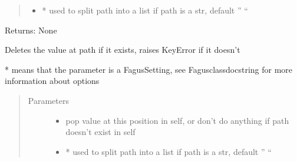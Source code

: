 \documentclass[a4paper,10pt,english]{sphinxmanual}
\begin{document}
\begin{fulllineitems}
\begin{fulllineitems}
\begin{quote}
\begin{description}
\begin{itemize}
\item {}
\sphinxAtStartPar
{} \textendash{} * used to split path into a list if path is a str, default ” “

\end{itemize}

\end{description}\end{quote}

\sphinxAtStartPar
Returns: None

\end{fulllineitems}


\begin{fulllineitems}
\label{\detokenize{fagus.fagus:fagus.fagus.Fagus.remove}}
\pysigstartsignatures
{}
\pysigstopsignatures
\sphinxAtStartPar
Deletes the value at path if it exists, raises KeyError if it doesn’t

\sphinxAtStartPar
* means that the parameter is a Fagus\sphinxhyphen{}Setting, see Fagus\sphinxhyphen{}class\sphinxhyphen{}docstring for more information about options
\begin{quote}\begin{description}
\item[{Parameters}] \leavevmode\begin{itemize}
\item {}
\sphinxAtStartPar
{} \textendash{} pop value at this position in self, or don’t do anything if path doesn’t exist in self

\item {}
\sphinxAtStartPar
{} \textendash{} * used to split path into a list if path is a str, default ” “

\end{itemize}

\end{description}\end{quote}


\end{fulllineitems}
\end{fulllineitems}
\end{document}
